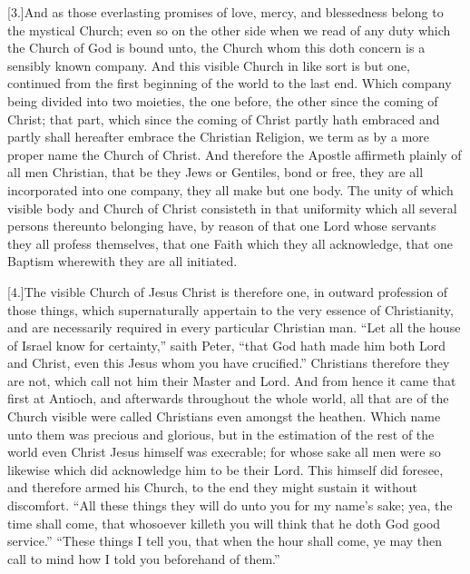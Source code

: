 [3.]And as those everlasting promises of love, mercy, and blessedness belong to the mystical Church; even so on the other side when we read of any duty which the Church of God is bound unto, the Church whom this doth concern is a sensibly known company. And this visible Church in like sort is but one, continued from the first beginning of the world to the last end. Which company being divided into two moieties, the one before, the other since the coming of Christ; that part, which since the coming of Christ partly hath embraced and partly shall hereafter embrace the Christian Religion, we term as by a more proper name the Church of Christ. And therefore the Apostle affirmeth plainly of all men Christian, that be they Jews or Gentiles, bond or free, they are all incorporated into one company, they all make but one body. The unity of which visible body and Church of Christ consisteth in that uniformity which all several persons thereunto belonging have, by reason of that one Lord whose servants they all profess themselves, that one Faith which they all acknowledge, that one Baptism wherewith they are all initiated.

[4.]The visible Church of Jesus Christ is therefore one, in outward profession of those things, which supernaturally appertain to the very essence of Christianity, and are necessarily required in every particular Christian man. “Let all the house of Israel know for certainty,” saith Peter, “that God hath made him both Lord and Christ, even this Jesus whom you have crucified.” Christians therefore they are not, which call not him their Master and Lord. And from hence it came that first at Antioch, and afterwards throughout the whole world, all that are of the Church visible were  called Christians even amongst the heathen. Which name unto them was precious and glorious, but in the estimation of the rest of the world even Christ Jesus himself was execrable; for whose sake all men were so likewise which did acknowledge him to be their Lord. This himself did foresee, and therefore armed his Church, to the end they might sustain it without discomfort. “All these things they will do unto you for my name’s sake; yea, the time shall come, that whosoever killeth you will think that he doth God good service.” “These things I tell you, that when the hour shall come, ye may then call to mind how I told you beforehand of them.”

